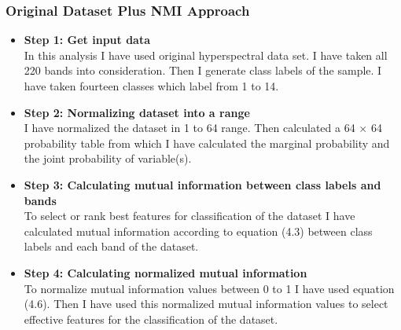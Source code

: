 \documentclass[document.tex]{subfiles}
\begin{document}
\subsubsection{Original Dataset Plus NMI Approach}
\begin{itemize}
	\item \textbf{Step 1: Get input data}\\
	In this analysis I have used original hyperspectral data set. I have taken all 220 bands into consideration. Then I generate class labels of the sample. I have taken
	fourteen classes which label from 1 to 14.
	\item \textbf{Step 2: Normalizing dataset into a range}\\
	I have normalized the dataset in 1 to 64 range. Then calculated a 64 $\times$ 64 probability table from which I have calculated the marginal probability and the joint probability of variable(s). 
	\item \textbf{Step 3: Calculating mutual information between class labels and bands}\\
	To select or rank best features for classification of the dataset I have calculated mutual information according to equation (4.3) between class labels and each band of the dataset.
	\item \textbf{Step 4: Calculating normalized mutual information}\\
	To normalize mutual information values between 0 to 1 I have used equation (4.6). Then I have used this normalized mutual information values to select effective features for the classification of the dataset. 
\end{itemize}
\end{document}
